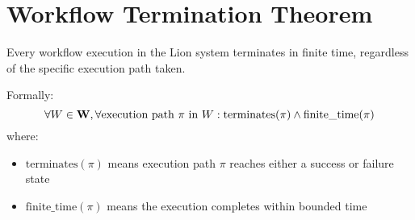 \section{Workflow Termination Theorem}

\begin{theorem}
\label{thm:ch4-workflow-termination}
Every workflow execution in the Lion system terminates in finite time, regardless of the specific execution path taken.

Formally:
\begin{equation}
\forall W \in \mathbf{W}, \forall \text{execution path } \pi \text{ in } W: \text{terminates}(\pi) \land \text{finite\_time}(\pi)
\end{equation}
where:
\begin{itemize}
\item $\text{terminates}(\pi)$ means execution path $\pi$ reaches either a success or failure state
\item $\text{finite\_time}(\pi)$ means the execution completes within bounded time
\end{itemize}
\end{theorem}

